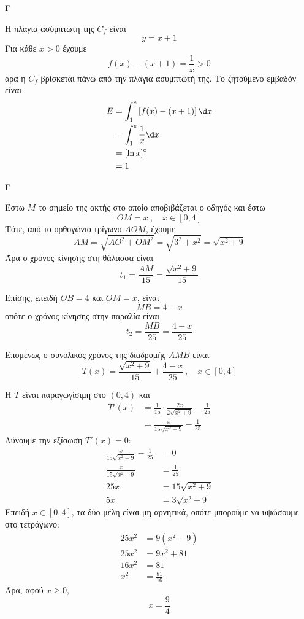 \begin{thema}{Γ}
\begin{erwthma}
\item Η πλάγια ασύμπτωτη της $C_f$ είναι
\[y=x+1\]
Για κάθε $x>0$ έχουμε
\[f(x)-(x+1)=\frac{1}{x}>0\]
άρα η $C_f$ βρίσκεται πάνω από την πλάγια ασύμπτωτή της.
Το ζητούμενο εμβαδόν είναι
\begin{align*}
E&=\dint_1^e\left[f(x)-(x+1)\right]\d x\\
&=\dint_1^e \frac{1}{x}\d x\\
&=\left[\ln x\right]_1^e\\
&=1
\end{align*}
\end{erwthma}
\end{thema}

\begin{thema}{Γ}
\begin{erwthma}
\item Έστω $M$ το σημείο της ακτής στο οποίο αποβιβάζεται ο οδηγός και έστω
\[OM=x\ ,\quad x\in[0,4]\]
Τότε, από το ορθογώνιο τρίγωνο $AOM$, έχουμε
\[AM=\sqrt{AO^2+OM^2}=\sqrt{3^2+x^2}=\sqrt{x^2+9}\]
Άρα ο χρόνος κίνησης στη θάλασσα είναι
\[t_1=\frac{AM}{15}=\frac{\sqrt{x^2+9}}{15}\]

Επίσης, επειδή $OB=4$ και $OM=x$, είναι
\[MB=4-x\]
οπότε ο χρόνος κίνησης στην παραλία είναι
\[t_2=\frac{MB}{25}=\frac{4-x}{25}\]

Επομένως ο συνολικός χρόνος της διαδρομής $AMB$ είναι
\[T(x)=\frac{\sqrt{x^2+9}}{15}+\frac{4-x}{25}\ ,\quad x\in[0,4]\]

\item Η $T$ είναι παραγωγίσιμη στο $(0,4)$ και
\begin{align*}
T'(x)&=\frac{1}{15}\cdot\frac{2x}{2\sqrt{x^2+9}}-\frac{1}{25}\\
&=\frac{x}{15\sqrt{x^2+9}}-\frac{1}{25}
\end{align*}
Λύνουμε την εξίσωση $T'(x)=0$:
\begin{align*}
\frac{x}{15\sqrt{x^2+9}}-\frac{1}{25}&=0\\
\frac{x}{15\sqrt{x^2+9}}&=\frac{1}{25}\\
25x&=15\sqrt{x^2+9}\\
5x&=3\sqrt{x^2+9}
\end{align*}
Επειδή $x\in[0,4]$, τα δύο μέλη είναι μη αρνητικά, οπότε μπορούμε να υψώσουμε στο τετράγωνο:
\begin{align*}
25x^2&=9(x^2+9)\\
25x^2&=9x^2+81\\
16x^2&=81\\
x^2&=\frac{81}{16}
\end{align*}
Άρα, αφού $x\geq 0$,
\[x=\frac{9}{4}\]


\end{erwthma}
\end{thema}
